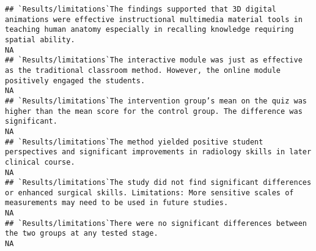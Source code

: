 \documentclass[]{article}
\begin{document}
\begin{verbatim}
## `Results/limitations`The findings supported that 3D digital animations were effective instructional multimedia material tools in teaching human anatomy especially in recalling knowledge requiring spatial ability.                                                                                                                                                                                                                                                                  NA
## `Results/limitations`The interactive module was just as effective as the traditional classroom method. However, the online module positively engaged the students.                                                                                                                                                                                                                                                                                                                    NA
## `Results/limitations`The intervention group’s mean on the quiz was higher than the mean score for the control group. The difference was significant.                                                                                                                                                                                                                                                                                                                                  NA
## `Results/limitations`The method yielded positive student perspectives and significant improvements in radiology skills in later clinical course.                                                                                                                                                                                                                                                                                                                                      NA
## `Results/limitations`The study did not find significant differences or enhanced surgical skills. Limitations: More sensitive scales of measurements may need to be used in future studies.                                                                                                                                                                                                                                                                                            NA
## `Results/limitations`There were no significant differences between the two groups at any tested stage.                                                                                                                                                                                                                                                                                                                                                                                NA

\end{verbatim}
\end{document}
